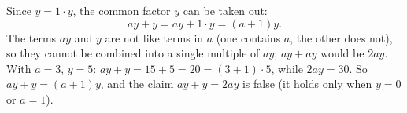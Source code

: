 Since $y=1\cdot y$, the common factor $y$ can be taken out:
\[ay+y=ay+1\cdot y=\boxed{(a+1)y}.\]
The terms $ay$ and $y$ are not like terms in $a$ (one contains $a$, the other does not), so they cannot be combined into a single multiple of $ay$; $ay+ay$ would be $2ay$. With $a=3$, $y=5$: $ay+y=15+5=20=(3+1)\cdot5$, while $2ay=30$. So $ay+y=(a+1)y$, and the claim $ay+y=2ay$ is false (it holds only when $y=0$ or $a=1$).
